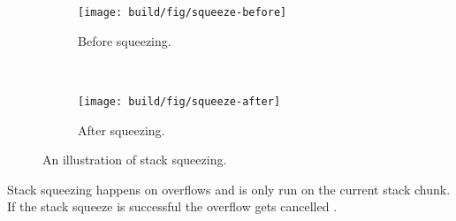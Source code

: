 \begin{figure}
\begin{mdframed}
  \begin{subfigure}[t]{0.5\textwidth}
    \texttt{[image: build/fig/squeeze-before]}
    \caption{Before squeezing.}
  \end{subfigure}
        ~ %
  \begin{subfigure}[t]{0.5\textwidth}
    \texttt{[image: build/fig/squeeze-after]}
    \caption{After squeezing.}
  \end{subfigure}
  \caption{An illustration of stack squeezing.}
  \label{fig:stack_squeezing}
\end{mdframed}
\end{figure}

Stack squeezing happens on overflows and is only run on the current
stack chunk. If the stack squeeze is successful the overflow gets cancelled
\cite{github_return_if_squeezed}.
